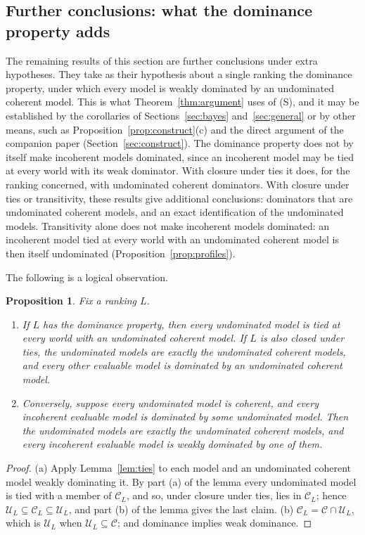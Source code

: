 \documentclass[11pt]{article}
\newtheorem{proposition}[theorem]{Proposition}
\theoremstyle{definition}
\theoremstyle{remark}
\newcommand{\C}{\mathcal C}
\newcommand{\U}{\mathcal U}
\begin{document}
\subsection{Further conclusions: what the dominance property adds}
The remaining results of this section are further conclusions under extra hypotheses. They take as their hypothesis about a single ranking the dominance property, under which every model is weakly dominated by an undominated coherent model. This is what Theorem~\ref{thm:argument} uses of (S), and it may be established by the corollaries of Sections~\ref{sec:bayes} and~\ref{sec:general} or by other means, such as Proposition~\ref{prop:construct}(c) and the direct argument of the companion paper (Section~\ref{sec:construct}). The dominance property does not by itself make incoherent models dominated, since an incoherent model may be tied at every world with its weak dominator. With closure under ties it does, for the ranking concerned, with undominated coherent dominators. With closure under ties or transitivity, these results give additional conclusions: dominators that are undominated coherent models, and an exact identification of the undominated models. Transitivity alone does not make incoherent models dominated: an incoherent model tied at every world with an undominated coherent model is then itself undominated (Proposition~\ref{prop:profiles}).

The following is a logical observation.
\begin{proposition}\label{prop:conclusion}
Fix a ranking $L$.
\begin{enumerate}[label=(\alph*)]
\item If $L$ has the dominance property, then every undominated model is tied at every world with an undominated coherent model. If $L$ is also closed under ties, the undominated models are exactly the undominated coherent models, and every other evaluable model is dominated by an undominated coherent model.
\item Conversely, suppose every undominated model is coherent, and every incoherent evaluable model is dominated by some undominated model. Then the undominated models are exactly the undominated coherent models, and every incoherent evaluable model is weakly dominated by one of them.
\end{enumerate}
\end{proposition}
\begin{proof}
(a) Apply Lemma~\ref{lem:ties} to each model and an undominated coherent model weakly dominating it. By part (a) of the lemma every undominated model is tied with a member of $\C_L$, and so, under closure under ties, lies in $\C_L$; hence $\U_L\subseteq\C_L\subseteq\U_L$, and part (b) of the lemma gives the last claim.
(b) $\C_L=\C\cap\U_L$, which is $\U_L$ when $\U_L\subseteq\C$; and dominance implies weak dominance.
\end{proof}
\end{document}
